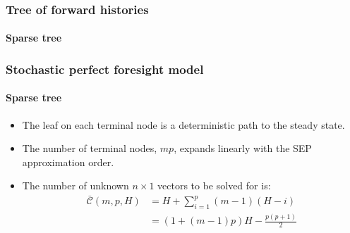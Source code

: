 \documentclass{beamer}
\begin{document}
\begin{frame}[c]{}
   \frametitle{Tree of forward histories}
   \framesubtitle{Sparse tree}
   \begin{center}

   \end{center}
\end{frame}


\begin{frame}
   \frametitle{Stochastic perfect foresight model}
   \framesubtitle{Sparse tree}

   \begin{itemize}

      \item The leaf on each terminal node is a deterministic path to the steady state.\newline

      \item The number of terminal nodes, $mp$, expands linearly with the SEP approximation order.\newline

      \item The number of unknown $n\times 1$ vectors to be solved for is:
            \[
               \begin{split}
                  \bar{\mathcal C}(m,p,H) & =  H+\sum_{i=1}^p(m-1)(H-i)                     \\
                                          & = \left( 1 + (m-1)p \right)H - \frac{p(p+1)}{2}
               \end{split}
            \]

   \end{itemize}

\end{frame}
\end{document}
